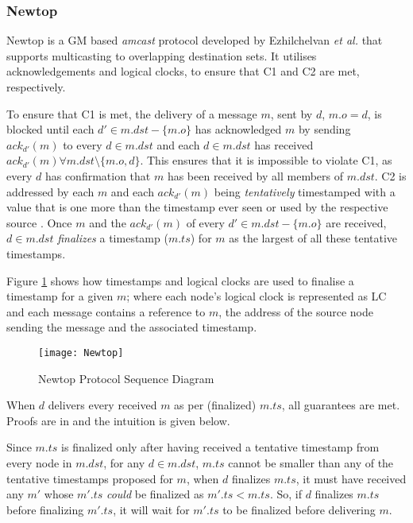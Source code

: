         \subsubsection{Newtop} \label{ssec:newtop}
        Newtop\citep{Ezhilchelvan:1995:NFG:876885.880005} is a GM based \emph{amcast} protocol developed by Ezhilchelvan \emph{et al.} that supports multicasting to overlapping destination sets.  It utilises acknowledgements and logical clocks, to ensure that C1 and C2 are met, respectively.  
        
        To ensure that C1 is met, the delivery of a message $m$, sent by $d$, $m.o=d$, is blocked until each $d' \in m.dst-\{m.o\}$ has acknowledged $m$ by sending $ack_{d'}(m)$ to every $d \in m.dst$ and each $d \in m.dst$ has received $ack_{d'}(m) \forall m.dst \setminus \{m.o,d\}$.  This ensures that it is impossible to violate C1, as every $d$ has confirmation that $m$ has been received by all members of $m.dst$.  
        C2 is addressed by each $m$ and each $ack_{d'}(m)$ being \emph{tentatively} timestamped with a value that is one more than the timestamp ever seen or used by the respective source \cite{Lamport:1978:TCO:359545.359563}. Once $m$ and the $ack_{d'}(m)$ of every $d'\in m.dst-\{m.o\}$ are received, $d \in m.dst$ \emph{finalizes} a timestamp ($m.ts$) for $m$ as the largest of all these tentative timestamps. 
        
        Figure \ref{fig:newtop} shows how timestamps and logical clocks are used to finalise a timestamp for a given $m$; where each node's logical clock is represented as LC and each message contains a reference to $m$, the address of the source node sending the message and the associated timestamp.  

    \begin{figure}[htbp!] 
                \centering    
                \texttt{[image: Newtop]}
                \caption[Newtop Atomic Multicast Protocol]{Newtop Protocol Sequence Diagram}
                \label{fig:newtop}
            \end{figure}	          
        
        When $d$ delivers every received $m$ as per (finalized) $m.ts$, all guarantees are met. Proofs are in \cite{Lamport:1978:TCO:359545.359563, Birman:1991:LCA:128738.128742, Ezhilchelvan:1995:NFG:876885.880005} and the intuition is given below.
        
        Since $m.ts$ is finalized only after having received a tentative timestamp from every node in $m.dst$, for any $d \in m.dst$, $m.ts$ cannot be smaller than any of the tentative timestamps proposed for $m$, when $d$ finalizes $m.ts$, it must have received any $m'$ whose $m'.ts$ \emph{could} be finalized as $m'.ts < m.ts$. So, if $d$ finalizes $m.ts$ before finalizing $m'.ts$, it will wait for $m'.ts$ to be finalized before delivering $m$.
        
